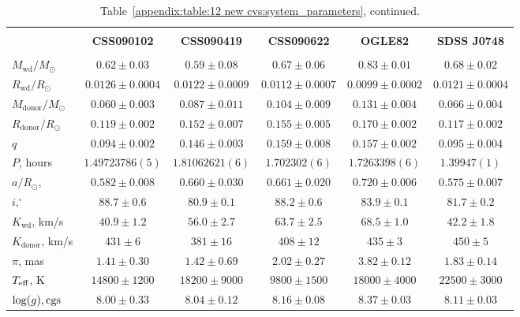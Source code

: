 \begin{landscape}
    \begin{table*}
        \centering
        \caption{Table~\ref{appendix:table:12 new cvs:system_parameters}, continued.}
        \label{appendix:table:12 new cvs:system_parameters cont 1}
        \begin{tabular}{lccccc}
            \hline \\
            ~                          & \textbf{CSS090102}     & \textbf{CSS090419}    & \textbf{CSS090622}    & \textbf{OGLE82}   & \textbf{SDSS J0748} \\
            \hline \hline \\
            $M_\mathrm{wd}/M_\odot$    & $0.62\pm0.03$          & $0.59\pm0.08$         & $0.67\pm0.06$         & $0.83\pm0.01$     & $0.68\pm0.02$ \\
            $R_\mathrm{wd}/R_\odot$    & $0.0126\pm0.0004$      & $0.0122\pm0.0009$     & $0.0112\pm0.0007$     & $0.0099\pm0.0002$ & $0.0121\pm0.0004$ \\
            $M_\mathrm{donor}/M_\odot$ & $0.060\pm0.003$        & $0.087\pm0.011$       & $0.104\pm0.009$       & $0.131\pm0.004$   & $0.066\pm0.004$ \\
            $R_\mathrm{donor}/R_\odot$ & $0.119\pm0.002$        & $0.152\pm0.007$       & $0.155\pm0.005$       & $0.170\pm0.002$   & $0.117\pm0.002$ \\
            $q$                        & $0.094\pm0.002$        & $0.146\pm0.003$       & $0.159\pm0.008$       & $0.157\pm0.002$   & $0.095\pm0.004$ \\
            \hline
            $P$, hours                 & $1.49723786(5)$        & $1.81062621(6)$       & $1.702302(6)$         & $1.7263398(6)$    & $1.39947(1)$ \\
            $a/R_\odot$,               & $0.582\pm0.008$        & $0.660\pm0.030$       & $0.661\pm0.020$       & $0.720\pm0.006$   & $0.575\pm0.007$ \\
            $i, ^\circ$                & $88.7\pm0.6$           & $80.9\pm0.1$          & $88.2\pm0.6$          & $83.9\pm0.1$      & $81.7\pm0.2$ \\
            $K_\mathrm{wd}$, km/s      & $40.9\pm1.2$           & $56.0\pm2.7$          & $63.7\pm2.5$          & $68.5\pm1.0$      & $42.2\pm1.8$ \\
            $K_\mathrm{donor}$, km/s   & $431\pm6$              & $381\pm16$            & $408\pm12$            & $435\pm3$         & $450\pm5$ \\
            \hline
            $\pi$, mas                 & $1.41\pm0.30$          & $1.42\pm0.69$         & $2.02\pm0.27$         & $3.82\pm0.12$     & $1.83\pm0.14$ \\
            $T_{\rm eff}$, K           & $14800\pm1200$         & $18200\pm9000$        & $9800\pm1500$         & $18000\pm4000$    & $22500\pm3000$ \\
            $\log(g), {\rm cgs}$       & $8.00\pm0.33$          & $8.04\pm0.12$         & $8.16\pm0.08$         & $8.37\pm0.03$     & $8.11\pm0.03$ \\
            \hline
            \hline
        \end{tabular}
    \end{table*}


\end{landscape}
